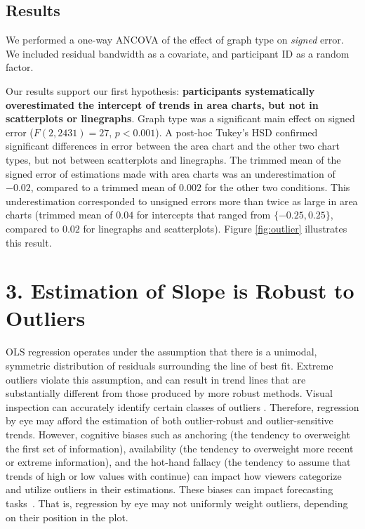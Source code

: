 \documentclass{sigchi}
\begin{document}
\subsection{Results}
We performed a one-way ANCOVA of the effect of graph type on \emph{signed} error. We included residual bandwidth as a covariate, and participant ID as a random factor.

Our results support our first hypothesis: \textbf{participants systematically overestimated the intercept of trends in area charts, but not in scatterplots or linegraphs}. Graph type was a significant main effect on signed error ($F(2,2431)=27$, $p<0.001$). A post-hoc Tukey's HSD confirmed significant differences in error between the area chart and the other two chart types, but not between scatterplots and linegraphs. The trimmed mean of the signed error of estimations made with area charts was an underestimation of $-0.02$, compared to a trimmed mean of $0.002$ for the other two conditions. This underestimation corresponded to unsigned errors more than twice as large in area charts (trimmed mean of $0.04$ for intercepts that ranged from $\{-0.25,0.25\}$, compared to $0.02$ for linegraphs and scatterplots). Figure \ref{fig:outlier} illustrates this result.

\section{3. Estimation of Slope is Robust to Outliers}

\outlierFig
OLS regression operates under the assumption that there is a unimodal, symmetric distribution of residuals surrounding the line of best fit. Extreme outliers violate this assumption, and can result in trend lines that are substantially different from those produced by more robust methods. Visual inspection can accurately identify certain classes of outliers \cite{albers2014task}. Therefore, regression by eye may afford the estimation of both outlier-robust and outlier-sensitive trends. However, cognitive biases such as anchoring (the tendency to overweight the first set of information), availability (the tendency to overweight more recent or extreme information), and the hot-hand fallacy (the tendency to assume that trends of high or low values with continue) can impact how viewers categorize and utilize outliers in their estimations. These biases can impact forecasting tasks~\cite{campbell2009anchoring,ji2001culture}. That is, regression by eye may not uniformly weight outliers, depending on their position in the plot.
\end{document}
